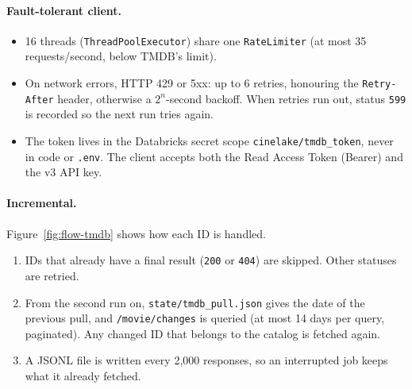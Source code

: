 \documentclass[12pt,a4paper]{article}
\newcommand{\code}[1]{\texttt{#1}}
\begin{document}
\paragraph{Fault-tolerant client.}
\begin{itemize}
  \item 16 threads (\code{ThreadPoolExecutor}) share one \code{RateLimiter} (at most 35 requests/second, below TMDB's
        limit).
  \item On network errors, HTTP 429 or 5xx: up to 6 retries, honouring the \code{Retry-After} header, otherwise a
        $2^{n}$-second backoff. When retries run out, status \code{599} is recorded so the next run tries again.
  \item The token lives in the Databricks secret scope \code{cinelake/tmdb\_token}, never in code or \code{.env}.
        The client accepts both the Read Access Token (Bearer) and the v3 API key.
\end{itemize}

\paragraph{Incremental.} Figure~\ref{fig:flow-tmdb} shows how each ID is handled.
\begin{enumerate}
  \item IDs that already have a final result (\code{200} or \code{404}) are skipped. Other statuses are retried.
  \item From the second run on, \code{state/tmdb\_pull.json} gives the date of the previous pull, and
        \code{/movie/changes} is queried (at most 14 days per query, paginated). Any changed ID that belongs to the
        catalog is fetched again.
  \item A JSONL file is written every 2,000 responses, so an interrupted job keeps what it already fetched.
\end{enumerate}
\end{document}
